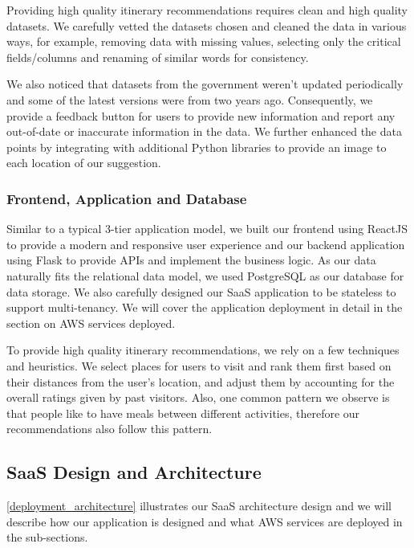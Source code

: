 \documentclass[12pt,a4paper]{article}
\begin{document}
        Providing high quality itinerary recommendations requires clean and high quality datasets. We carefully vetted the datasets chosen and cleaned the data in various ways, for example, removing data with missing values, selecting only the critical fields/columns and renaming of similar words for consistency.
        
        We also noticed that datasets from the government weren’t updated periodically and some of the latest versions were from two years ago. Consequently, we provide a feedback button for users to provide new information and report any out-of-date or inaccurate information in the data. We further enhanced the data points by integrating with additional Python libraries to provide an image to each location of our suggestion.


        \subsubsection{Frontend, Application and Database}
        
        Similar to a typical 3-tier application model, we built our frontend using ReactJS to provide a modern and responsive user experience and our backend application using Flask to provide APIs and implement the business logic. As our data naturally fits the relational data model, we used PostgreSQL as our database for data storage. We also carefully designed our SaaS application to be stateless to support multi-tenancy. We will cover the application deployment in detail in the section on AWS services deployed.

        To provide high quality itinerary recommendations, we rely on a few techniques and heuristics. We select places for users to visit and rank them first based on their distances from the user’s location, and adjust them by accounting for the overall ratings given by past visitors. Also, one common pattern we observe is that people like to have meals between different activities, therefore our recommendations also follow this pattern.


    \subsection{SaaS Design and Architecture}
    \autoref{deployment_architecture} illustrates our SaaS architecture design and we will describe how our application is designed and what AWS services are deployed in the sub-sections.
    
\end{document}
